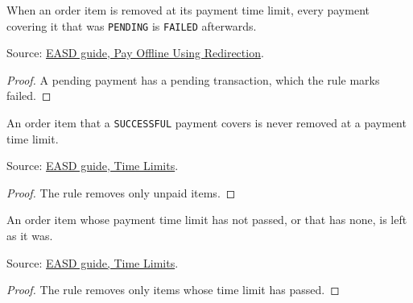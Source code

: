 \begin{theorem}
  \label{thm:payment-expire-fails-pending}
  When an order item is removed at its payment time limit, every payment
  covering it that was \texttt{PENDING} is \texttt{FAILED} afterwards.

  Source: \href{https://standards.atlassian.net/wiki/spaces/EASD/pages/574455927/Pay+Offline+Using+Redirection}{EASD guide, Pay Offline Using Redirection}.
\end{theorem}
\begin{proof}
  A pending payment has a pending transaction, which the rule marks failed.
\end{proof}

\begin{theorem}
  \label{thm:payment-expire-keeps-paid}
  An order item that a \texttt{SUCCESSFUL} payment covers is never removed at
  a payment time limit.

  Source: \href{https://standards.atlassian.net/wiki/spaces/EASD/pages/574423066/Time+Limits}{EASD guide, Time Limits}.
\end{theorem}
\begin{proof}
  The rule removes only unpaid items.
\end{proof}

\begin{theorem}
  \label{thm:payment-expire-before-limit}
  An order item whose payment time limit has not passed, or that has none,
  is left as it was.

  Source: \href{https://standards.atlassian.net/wiki/spaces/EASD/pages/574423066/Time+Limits}{EASD guide, Time Limits}.
\end{theorem}
\begin{proof}
  The rule removes only items whose time limit has passed.
\end{proof}

